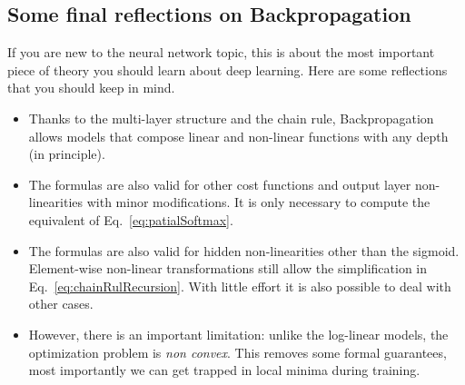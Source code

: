 \subsection{Some final reflections on Backpropagation}

If you are new to the neural network topic, this is about the most important
piece of theory you should learn about deep learning. Here are some reflections
that you should keep in mind.

\begin{itemize}
\item Thanks to the multi-layer structure and the chain rule, Backpropagation allows models that compose linear and non-linear functions with any depth (in principle\footnotemark). 

\item The formulas are also valid for other cost functions and output layer non-linearities with minor modifications. It is only necessary to compute the equivalent of Eq.~\ref{eq:patialSoftmax}. 

\item The formulas are also valid for hidden non-linearities other than the sigmoid. Element-wise non-linear transformations still allow the simplification in Eq.~\ref{eq:chainRulRecursion}. With little effort it is also possible to deal with other cases.

\item However, there is an important limitation: unlike the log-linear models, the optimization problem is \textit{non convex}. This removes some formal guarantees, most importantly we can get trapped in local minima during training.
\end{itemize}


%
%
%


